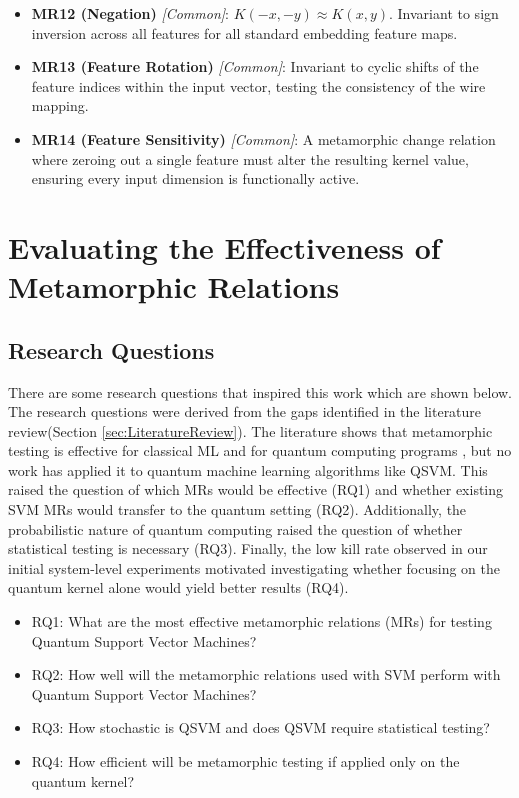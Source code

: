\documentclass[12pt,a4paper]{article}
\begin{document}
\begin{itemize}
		\item \textbf{MR12 (Negation)} \textit{[Common]}: $K(-x,-y) \approx K(x,y)$. Invariant to sign inversion across all features for all standard embedding feature maps. \cite{xie2011}
		
		\item \textbf{MR13 (Feature Rotation)} \textit{[Common]}: Invariant to cyclic shifts of the feature indices within the input vector, testing the consistency of the wire mapping. \cite{LaRose2020}
		
		\item \textbf{MR14 (Feature Sensitivity)} \textit{[Common]}: A metamorphic change relation where zeroing out a single feature must alter the resulting kernel value, ensuring every input dimension is functionally active. \cite{Segura2016}
	\end{itemize}
	
	\section{Evaluating the Effectiveness of Metamorphic Relations}
	\label{sec:evaluation}
	
	\subsection{Research Questions}
	
		There are some research questions that inspired this work which are shown below. The research questions were derived from the gaps identified in the literature review(Section \ref{sec:LiteratureReview}). The literature shows that metamorphic testing is effective for classical ML \cite{Dwarakanath2018, ssantos2020} and for quantum computing programs \cite{Paltenghi2023, gracia2024}, but no work has applied it to quantum machine learning algorithms like QSVM. This raised the question of which MRs would be effective (RQ1) and whether existing SVM MRs would transfer to the quantum setting (RQ2). Additionally, the probabilistic nature of quantum computing raised the question of whether statistical testing is necessary (RQ3). Finally, the low kill rate observed in our initial system-level experiments motivated investigating whether focusing on the quantum kernel alone would yield better results (RQ4).
	

	\begin{itemize}
		\item RQ1: What are the most effective metamorphic relations (MRs) for testing Quantum Support Vector Machines?
		\item RQ2: How well will the metamorphic relations used with SVM perform with Quantum Support Vector Machines?
		\item RQ3: How stochastic is QSVM and does QSVM require statistical testing?
		\item RQ4: How efficient will be metamorphic testing if applied only on the quantum kernel?
	\end{itemize}
	
\end{document}
